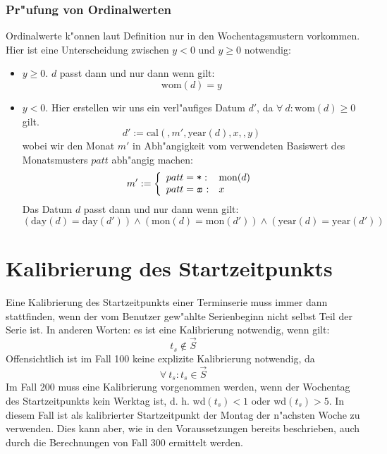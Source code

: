 \documentclass[a4paper]{article}
\newcommand*{\dayf}{\mathrm{day}}
\newcommand*{\monf}{\mathrm{mon}}
\newcommand*{\yearf}{\mathrm{year}}
\newcommand*{\womf}{\mathrm{wom}}
\newcommand*{\calf}{\mathrm{cal}}
\numberwithin{equation}{section}
\begin{document}
\subsubsection{Pr"ufung von Ordinalwerten}
Ordinalwerte k"onnen laut Definition nur in den Wochentagsmustern vorkommen.
Hier ist eine Unterscheidung zwischen $y < 0$ und $y \ge 0$ notwendig:
\begin{itemize}
\item $y \ge 0$. $d$ passt dann und nur dann wenn gilt:
  \begin{equation}\womf(d) = y\end{equation}
\item $y < 0$. Hier erstellen wir uns ein verl"aufiges Datum $d'$,
  da $\forall\ d: \womf(d) \ge 0$ gilt.
  \begin{equation}d' := \calf(, m', \yearf(d), x, , y)\end{equation}
  wobei wir den Monat $m'$ in Abh"angigkeit vom verwendeten Basiswert des
  Monatsmusters $patt$ abh"angig machen:
  \begin{equation}
  m' := \left\{\begin{array}{ll}
  patt = \texttt{*} : & \monf(d) \\
  patt = \texttt{\textit{x}} : & x \\
  \end{array}\right.
  \end{equation}
  Das Datum $d$ passt dann und nur dann wenn gilt:
  \begin{equation}
    (\dayf(d) = \dayf(d')) \wedge (\monf(d) = \monf(d')) \wedge
    (\yearf(d) = \yearf(d'))
  \end{equation}
\end{itemize}



%
%
%
%
\section{Kalibrierung des Startzeitpunkts}
\noindent Eine Kalibrierung des Startzeitpunkts einer Terminserie muss immer
dann stattfinden, wenn der vom Benutzer gew"ahlte Serienbeginn nicht selbst Teil
der Serie ist. In anderen Worten: es ist eine Kalibrierung notwendig, wenn gilt:
\begin{equation}
  t_s \notin \vec{S}
\end{equation}
Offensichtlich ist im Fall 100 keine explizite Kalibrierung notwendig, da
\begin{equation}
  \forall\ t_s : t_s \in \vec{S}
\end{equation}
Im Fall 200 muss eine Kalibrierung vorgenommen werden, wenn der Wochentag des
Startzeitpunkts kein Werktag ist, d. h. wd$(t_s) < 1$ oder wd$(t_s) > 5$. In
diesem Fall ist als kalibrierter Startzeitpunkt der Montag der n"achsten Woche
zu verwenden. Dies kann aber, wie in den Voraussetzungen bereits beschrieben,
auch durch die Berechnungen von Fall 300 ermittelt werden.
\end{document}
